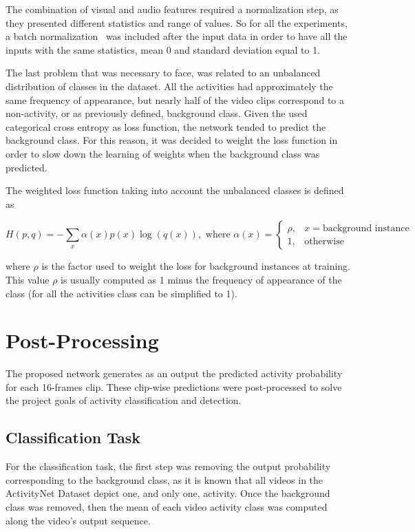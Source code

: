 The combination of visual and audio features required a normalization step, as they presented different statistics and range of values.
So for all the experiments, a batch normalization~\cite{ioffe2015batch} was included after the input data in order to have all the inputs with the same statistics, mean 0 and standard deviation equal to 1.

The last problem that was necessary to face, was related to an unbalanced distribution of classes in the dataset. All the activities had approximately the same frequency of appearance, but nearly half of the video clips correspond to a non-activity, or as previously defined, background class.
Given the used categorical cross entropy as loss function, the network tended to predict the background class. For this reason, it was decided to weight the loss function in order to slow down the learning of weights when the background class was predicted.

The weighted loss function taking into account the unbalanced classes is defined as

\begin{equation}
	H(p,q) = - \sum_x \alpha(x) p(x) \log (q(x)), \text{ where } \alpha(x) =
    \begin{cases}
        \rho, & x = \text{background instance}\\
        1,    & \text{otherwise}
    \end{cases}
\end{equation}

where $\rho$ is the factor used to weight the loss for background instances at training. This value $\rho$ is usually computed as 1 minus the frequency of appearance of the class (for all the activities class can be simplified to 1).

\section{Post-Processing}
\label{section:post_processing}

The proposed network generates as an output the predicted activity probability for each 16-frames clip.
These clip-wise predictions were post-processed to solve the project goals of activity classification and detection.

\subsection{Classification Task}

For the classification task, the first step was removing the output probability corresponding to the background class, as it is known that all videos in the ActivityNet Dataset depict one, and only one, activity. Once the background class was removed, then the mean of each video activity class was computed along the video's output sequence.

